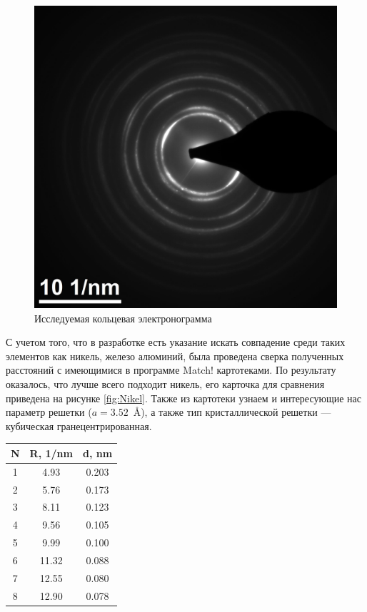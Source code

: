 \documentclass[a4paper, 12pt]{article}
\begin{document}
\begin{figure}[H]
	\centering
	\includegraphics[width=0.7\linewidth]{K3} 
	\caption{Исследуемая кольцевая электронограмма}
	\label{fig:circle}
\end{figure}

С учетом того, что в разработке есть указание искать совпадение среди таких элементов как никель, железо алюминий, была проведена сверка полученных расстояний с имеющимися в программе Match! картотеками. По результату оказалось, что лучше всего подходит никель, его карточка для сравнения приведена на рисунке \ref{fig:Nikel}. Также из картотеки узнаем и интересующие нас параметр решетки ($a = 3.52$~\AA), а также тип кристаллической решетки --- кубическая гранецентрированная.

\begin{table}[H]
	\centering
	\begin{tabular}{|c|c|c|}
		\hline
		N & R, 1/nm & d, nm \\
		\hline
		1 & 4.93 & 0.203  \\
		\hline
		2 & 5.76 & 0.173  \\
		\hline
		3 & 8.11 & 0.123  \\
		\hline
		4 & 9.56 & 0.105  \\
		\hline
		5 & 9.99 & 0.100  \\
		\hline
		6 & 11.32 & 0.088 \\
		\hline
		7 & 12.55 & 0.080  \\
		\hline
		8 & 12.90 & 0.078  \\
		\hline
	\end{tabular}
\end{table}
\end{document}
